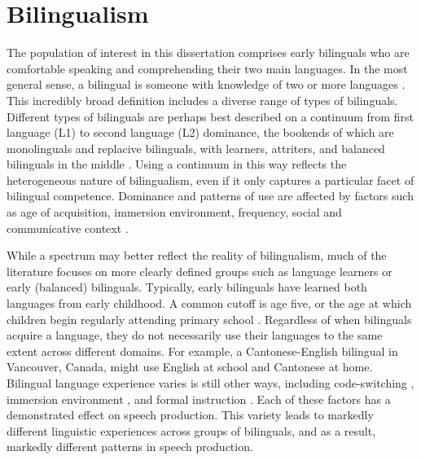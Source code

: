 \section{Bilingualism}\label{ch1:sec:bilingualism}

The population of interest in this dissertation comprises early bilinguals who are comfortable speaking and comprehending their two main languages. In the most general sense, a bilingual is someone with knowledge of two or more languages \citep{grosjean_1989_bilingual}. This incredibly broad definition includes a diverse range of types of bilinguals. Different types of bilinguals are perhaps best described on a continuum from first language (L1) to second language (L2) dominance, the bookends of which are monolinguals and replacive bilinguals, with learners, attriters, and balanced bilinguals in the middle \citep{gertken_2014_blp}. Using a continuum in this way reflects the heterogeneous nature of bilingualism, even if it only captures a particular facet of bilingual competence. Dominance and patterns of use are affected by factors such as age of acquisition, immersion environment, frequency, social and communicative context \citep{gertken_2014_blp}. 

While a spectrum may better reflect the reality of bilingualism, much of the literature focuses on more clearly defined groups such as language learners or early (balanced) bilinguals. Typically, early bilinguals have learned both languages from early childhood. A common cutoff is age five, or the age at which children begin regularly attending primary school \citep{amengual_2017_type}. Regardless of when bilinguals acquire a language, they do not necessarily use their languages to the same extent across different domains. For example, a Cantonese-English bilingual in Vancouver, Canada, might use English at school and Cantonese at home. Bilingual language experience varies is still other ways, including code-switching \citep{fricke_2016_dimensions}, immersion environment \citep{sancier_1997_drift}, and formal instruction \citep{fricke_2019_bilingualism}. Each of these factors has a demonstrated effect on speech production. This variety leads to markedly different linguistic experiences across groups of bilinguals, and as a result, markedly different patterns in speech production. 

